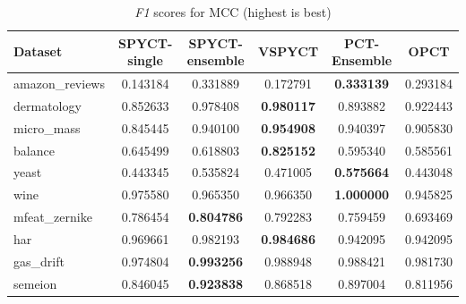 \documentclass[3p,review,authoryear]{elsarticle}
\begin{document}
\begin{table}[h!]
\centering
\caption{\textit{F1} scores for MCC (highest is best)}
\label{tab:mcc_results}
\begin{tabular}{@{}lccccc@{}}
\toprule
Dataset & SPYCT-single & SPYCT-ensemble & VSPYCT & PCT-Ensemble & OPCT \\ \midrule
amazon\_reviews & 0.143184 & 0.331889 & 0.172791 & \textbf{0.333139} & 0.293184 \\
dermatology      & 0.852633 & 0.978408 & \textbf{0.980117} & 0.893882 & 0.922443 \\
micro\_mass      & 0.845445 & 0.940100 & \textbf{0.954908} & 0.940397 & 0.905830 \\
balance          & 0.645499 & 0.618803 & \textbf{0.825152} & 0.595340 & 0.585561 \\
yeast            & 0.443345 & 0.535824 & 0.471005 & \textbf{0.575664} & 0.443048 \\
wine             & 0.975580 & 0.965350 & 0.966350 & \textbf{1.000000} & 0.945825 \\
mfeat\_zernike   & 0.786454 & \textbf{0.804786} & 0.792283 & 0.759459 & 0.693469 \\
har              & 0.969661 & 0.982193 & \textbf{0.984686} & 0.942095 & 0.942095 \\
gas\_drift        & 0.974804 & \textbf{0.993256} & 0.988948 & 0.988421 & 0.981730 \\
semeion          & 0.846045 & \textbf{0.923838} & 0.868518 & 0.897004 & 0.811956 \\
\bottomrule
\end{tabular}
\end{table}
\end{document}
